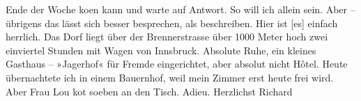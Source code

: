 \begin{ledgroupsized}[t]{13cm}
               Ende der Woche ko{\geminationm}en kann und warte auf Antwort. So will
               ich allein sein. Aber – übrigens das lässt sich besser besprechen, als beschreiben.
               Hier ist {\pb}{[}es{]} einfach herrlich. Das Dorf liegt über der Brennerstrasse über 1000 Meter hoch zwei einviertel Stunden mit
               Wagen von Innsbruck. Absolute Ruhe, ein kleines
               Gasthaus – »Jagerhof« für Fremde eingerichtet, aber
               absolut nicht Hôtel. Heute übernachtete ich in einem Bauernhof, weil mein Zimmer erst
               heute frei wird. Aber Frau Lou ko{\geminationm}t soeben an den Tisch. Adieu.\pend
           \pstart Herzlichst \spacefill\mbox{Richard}\pend{}
         
         \endnumbering{}\end{ledgroupsized}  \newcommand{\dateiname}{L00480}\newcommand{\titel}{Richard Beer-Hofmann an Arthur Schnitzler, 10. 9. 1895}\newcommand{\editorInnen}{Martin Anton Müller und Gerd-Hermann Susen}
      